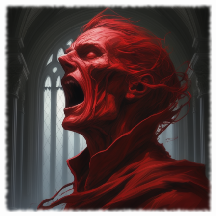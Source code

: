 \begin{figure}[h]
\begin{center}
\includegraphics[scale=0.24]{img/ai-images/pain-spirit.png}
\end{center}
\end{figure}
